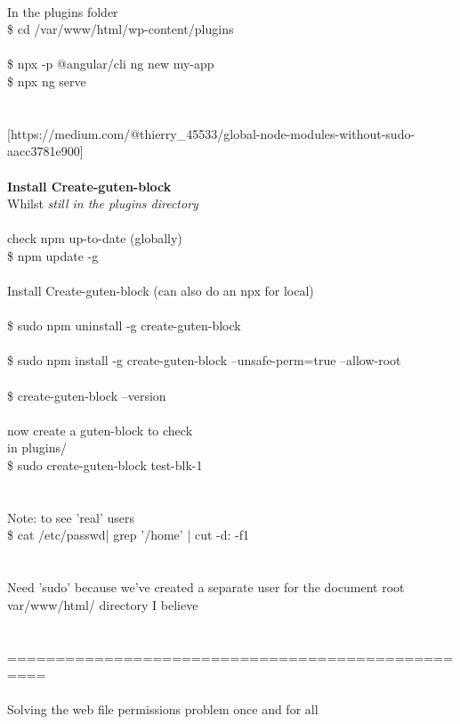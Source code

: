 \documentclass[10pt,a4paper]{article}
\begin{document}
{{{{{{{{{{{{{{{{\\
In the plugins folder\\
\$ cd /var/www/html/wp-content/plugins}{\large \\
\\
\$ npx -p @angular/cli ng new my-app\\
\$ npx ng serve\\
\\
\\
[https://medium.com/@thierry\_45533/global-node-modules-without-sudo-aacc3781e900}{\large ]\\
\\
\textbf{Install Create-guten-block}}{\large \\
Whilst \textit{still in the plugins directory}}{\large \\
\\
check npm up-to-date (globally)\\
\$ npm update -g\\
\\
Install Create-guten-block (can also do an npx for local)\\
\\
\$ sudo npm uninstall -g create-guten-block\\
\\
\$ sudo npm install -g create-guten-block --unsafe-perm=true --allow-root\\
\\
\$ create-guten-block --version\\
\\
now create a guten-block to check\\
in plugins/ \\
\$ sudo create-guten-block test-blk-1\\
\\
\\
Note: to see 'real' users\\
\$ cat /etc/passwd}{\large  | grep '/home' | cut -d: -f1\\
\\
\\
Need 'sudo' because we've created a separate user for the document root var/www/html/ directory I believe\\
\\
\\
==================================================\\
\\
Solving the web file permissions problem once and for all\\
}}}}}}}}}}}}}}}}
\end{document}
